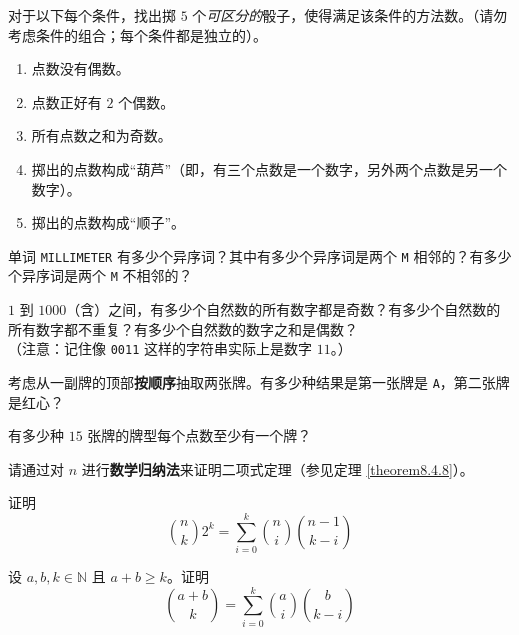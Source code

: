 \begin{exercise}
    对于以下每个条件，找出掷 $5$ 个\emph{可区分的}骰子，使得满足该条件的方法数。（请勿考虑条件的组合；每个条件都是独立的）。
    \begin{enumerate}[label=(\alph*)]
        \item 点数没有偶数。
        \item 点数正好有  $2$ 个偶数。
        \item 所有点数之和为奇数。
        \item 掷出的点数构成``葫芦''（即，有三个点数是一个数字，另外两个点数是另一个数字）。
        \item 掷出的点数构成``顺子''。
    \end{enumerate}
\end{exercise}

\begin{exercise}
    单词 \verb|MILLIMETER| 有多少个异序词？其中有多少个异序词是两个 \verb|M| 相邻的？有多少个异序词是两个 \verb|M| 不相邻的？
\end{exercise}

\begin{exercise}
    $1$ 到 $1000$（含）之间，有多少个自然数的所有数字都是奇数？有多少个自然数的所有数字都不重复？有多少个自然数的数字之和是偶数？\\
    （注意：记住像 \verb|0011| 这样的字符串实际上是数字 $11$。）
\end{exercise}

\begin{exercise}
    考虑从一副牌的顶部\textbf{按顺序}抽取两张牌。有多少种结果是第一张牌是 \verb|A|，第二张牌是红心？
\end{exercise}

\begin{exercise}
    有多少种 $15$ 张牌的牌型每个点数至少有一个牌？
\end{exercise}

\begin{exercise}\label{exc:exercises8.9.14}
    请通过对 $n$ 进行\textbf{数学归纳法}来证明二项式定理（参见定理 \ref{theorem8.4.8}）。
\end{exercise}

\begin{exercise}
    证明
    \[{n \choose k}2^k = \sum_{i=0}^{k}{n \choose i}{n-1 \choose k-i}\]
\end{exercise}

\begin{exercise}
    设 $a,b,k \in \mathbb{N}$ 且 $a+b \ge k$。证明
    \[{a+b \choose k} = \sum_{i=0}^{k}{a \choose i}{b \choose k-i}\]
\end{exercise}

